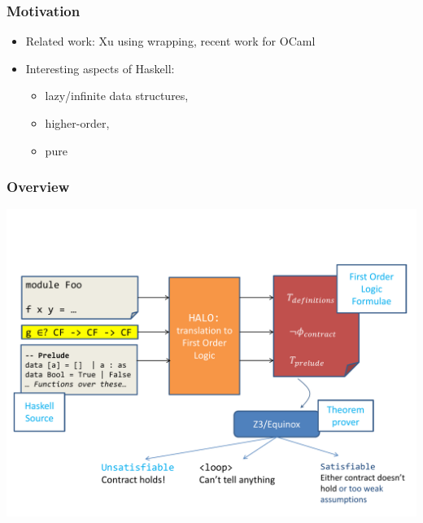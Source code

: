 \documentclass[serif,professionalfont]{beamer}
\begin{document}
\begin{frame}[fragile]
  \frametitle{Motivation}

  \begin{itemize}

    \item Related work:
      Xu using wrapping, recent work for OCaml

    \item Interesting aspects of Haskell:
      \begin{itemize}
        \item lazy/infinite data structures,
        \item higher-order,
        \item pure
      \end{itemize}
  \end{itemize}

\end{frame}

\begin{frame}[fragile]
  \frametitle{Overview}

  \includegraphics[width=\textwidth]{overview.pdf}

\end{frame}
\end{document}
